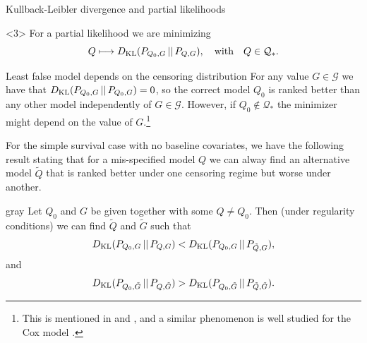 \documentclass[smaller]{beamer}\usepackage{listings}
\begin{document}
\begin{frame}[label={sec:org553cac0}]{Kullback-Leibler divergence and partial likelihoods}
\begin{onlyenv}<3>
For a partial likelihood we are minimizing
\begin{equation*}
  Q \longmapsto D_{\mathrm{KL}}(P_{Q_0,G} \, || \, P_{Q,G}),
  \quad \text{with} \quad Q \in \mathcal{Q}_*.
\end{equation*}
\color{black}

\vfill

\end{onlyenv}
\end{frame}

\begin{frame}[label={sec:org2d983cd}]{Least false model depends on the censoring distribution}
\small For any value \(G \in \mathcal{G}\) we have that \(D_{\mathrm{KL}}(P_{Q_0,G} \, || \, P_{Q_0,G}) = 0\), so
the correct model \(Q_0\) is ranked better than any other model independently of \(G \in \mathcal{G}\).
However, if \(Q_0 \not \in \mathcal{Q}_*\) the minimizer might depend on the value of \(G\).\footnote{This is mentioned in \cite{whitney2019comment} and \cite{van2003unicv}, and a similar
phenomenon is well studied for the Cox model
\citep{struthers1986misspecified,hjort1992inference,fine2002comparing}.}

\vfill

For the simple survival case with no baseline covariates, we have the following result stating that
for a mis-specified model \(Q\) we can alway find an alternative model \(\tilde Q\) that is ranked
better under one censoring regime but worse under another.

\vfill


\begin{beamercolorbox}[rounded=true]{gray}
Let $Q_0$ and $G$ be given together with some $Q \not = Q_0$. Then (under
regularity conditions) we can find $\tilde Q$ and $\tilde G$ such
that
\begin{equation*}
  D_{\mathrm{KL}}(P_{Q_0, G} \, || \, P_{Q, G}) < D_{\mathrm{KL}}(P_{Q_0, G} \, || \, P_{\tilde Q, G}),
\end{equation*}
and
\begin{equation*}
  D_{\mathrm{KL}}(P_{Q_0, \tilde G} \, || \, P_{Q, \tilde G}) > D_{\mathrm{KL}}(P_{Q_0, \tilde G} \, || \, P_{\tilde Q,
    \tilde G}).
\end{equation*}
\end{beamercolorbox}
\end{frame}
\end{document}
